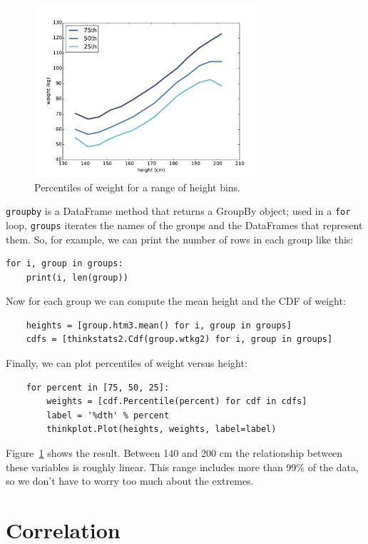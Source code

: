 \documentclass[12pt]{book}
\begin{document}
\begin{figure}
\centerline{\includegraphics[height=2.5in]{figs/scatter3.pdf}}
\caption{Percentiles of weight for a range of height bins.}
\label{scatter3}
\end{figure}

{\tt groupby} is a DataFrame method that returns a GroupBy object;
used in a {\tt for} loop, {\tt groups} iterates the names of the groups
and the DataFrames that represent them.  So, for example, we can
print the number of rows in each group like this:

\begin{verbatim}
for i, group in groups:
    print(i, len(group))
\end{verbatim}

Now for each group we can compute the mean height and the CDF
of weight:

\begin{verbatim}
    heights = [group.htm3.mean() for i, group in groups]
    cdfs = [thinkstats2.Cdf(group.wtkg2) for i, group in groups]
\end{verbatim}

Finally, we can
plot percentiles of weight versus height:

\begin{verbatim}
    for percent in [75, 50, 25]:
        weights = [cdf.Percentile(percent) for cdf in cdfs]
        label = '%dth' % percent
        thinkplot.Plot(heights, weights, label=label)
\end{verbatim}

Figure~\ref{scatter3} shows the result.  Between 140 and 200 cm
the relationship between these variables is roughly linear.  This range
includes more than 99\% of the data, so we don't have to worry
too much about the extremes.


\section{Correlation}
\end{document}
